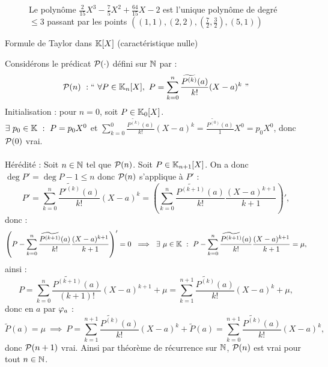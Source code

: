 \documentclass{article}
\renewenvironment{question_kholle}[2][ ]
{
	\subsection{\texorpdfstring{#2}{}}
	\notblank{#1}
	{
		\noindent #1
		\bigbreak
	}
	{}
	\begin{proof}
}
{
	\end{proof}
}
\begin{document}
\begin{question_kholle}
\begin{figure}[H]
		\caption{Le polynôme $\frac{2}{15}X^3 - \frac 7 5 X^2 + \frac{64}{15}X - 2$ est l'unique polynôme de degré $\leqslant 3$ passant par les points $\displaystyle \left((1, 1), (2, 2), \left(\frac 7 2, \frac 3 2 \right), (5, 1)\right)$}
	\end{figure}

\end{question_kholle}

\begin{question_kholle}
	[Soient $P$ à coefficients dans $\K$ et $a\in \K$. On a :
		\begin{equation}
			P = \sum_{n\in \N}\frac{\widetilde{P^{(n)}}(a)}{n!}(X-a)^n
		\end{equation}
	]
	{Formule de Taylor dans $\mathbb K [X]$ (caractéristique nulle)}

	Considérons le prédicat $\mathcal P (\cdot)$ défini sur $\mathbb N$ par :
	\[
		\PRIME (n ) \ :  \text{\textquotedblleft} \ \forall P \in \K _n[X], \ P = \sum_{k = 0}^n\frac{\widetilde{P^{(k)}}(a)}{k!}(X-a)^k \ \text{\textquotedblright}
	\]
	Initialisation : pour $n = 0 $, soit $P\in \mathbb K _0 [X]$. \\
	$\exists \ p_0 \in \mathbb K \ : \ P = p_0 X^0$ et $\sum_{k = 0}^0\frac{\widetilde{P^{(k)}}(a)}{k!}(X-a)^k = \frac{\widetilde{P^{(0)}}(a)}{1}X^0 = p_0 X^0$, donc $\mathcal P (0)$ vrai. \\ \\
	Hérédité : Soit $n\in \mathbb N$ tel que $\mathcal P (n)$. Soit $P\in \mathbb K _{n+1} [X]$. On a donc $\deg P' = \deg P -1 \leq n$ donc $\mathcal P (n)$ s'applique à $P'$ :
	\[
		P' = \sum_{k = 0}^n\frac{\widetilde{P'^{(k)}}(a)}{k!}(X-a)^k = \left( \sum_{k = 0}^n\frac{\widetilde{P^{(k+1)}}(a)}{k!}\frac{(X-a)^{k+1}}{k+1} \right) ',
	\]
	donc :
	\[
		\left( P - \sum_{k = 0}^n\frac{\widetilde{P^{(k+1)}}(a)}{k!}\frac{(X-a)^{k+1}}{k+1} \right) ' = 0 \ \implies \ \exists \ \mu \in \mathbb K \ : \ P - \sum_{k = 0}^n\frac{\widetilde{P^{(k+1)}}(a)}{k!}\frac{(X-a)^{k+1}}{k+1} = \mu ,
	\]
	ainsi :
	\[
		P = \sum_{k = 0}^n\frac{\widetilde{P^{(k+1)}}(a)}{(k+1)!}(X-a)^{k+1} + \mu = \sum_{k = 1}^{n+1}\frac{\widetilde{P^{(k)}}(a)}{k!}(X-a)^{k} + \mu,
	\]
	donc en $a$ par $\varphi _ a$ :
	\[
		\widetilde{P}(a) = \mu \ \implies \ P = \sum_{k = 1}^{n+1}\frac{\widetilde{P^{(k)}}(a)}{k!}(X-a)^{k} + \widetilde{P}(a) = \sum_{k = 0}^{n+1}\frac{\widetilde{P^{(k)}}(a)}{k!}(X-a)^{k},
	\]
	donc $\mathcal P (n+1) $ vrai. Ainsi par théorème de récurrence sur $\mathbb N$, $\mathcal P (n)$ est vrai pour tout $n\in \mathbb N$.
\end{question_kholle}
\end{document}

